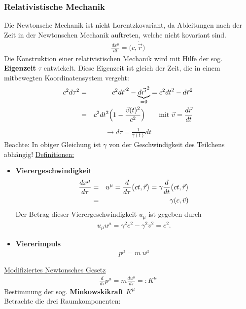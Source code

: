 \subsubsection{Relativistische Mechanik}
Die Newtonsche Mechanik ist nicht Lorentzkovariant, da Ableitungen nach der Zeit in der Newtonschen Mechanik auftreten, welche nicht kovariant sind.
\begin{eqnarray*} \frac{dx^ {\mu}}{dt} = \big ( c, \dot{\vec r} \big)\end{eqnarray*}
Die Konstruktion einer relativistischen Mechanik wird mit Hilfe der sog. {\bf Eigenzeit $\tau$} entwickelt. Diese Eigenzeit ist gleich der Zeit, die in einem mitbewegten Koordinatensystem vergeht:
\begin{eqnarray*}
c^2d\tau^2 &=& c^2{dt'}^2 -\underbrace{d\vec {r'}^2}_{= 0} = c^2{dt}^2 - d\vec r^2\\
&=& c^2dt^2\Big ( 1- \frac{\vec v(t)^2}{c^2} \Big) \qquad \text{mit }\vec v = \frac{d\vec r}{dt}
\end{eqnarray*}
\begin{eqnarray*}
\rightarrow \boxed{d\tau = \frac 1 {\gamma(t)} dt} \end{eqnarray*}
Beachte: In obiger Gleichung ist $\gamma$ von der Geschwindigkeit des Teilchens abhängig!
\underline{Definitionen:} 
\begin{itemize} \item{\bf Vierergeschwindigkeit}\\
\begin{eqnarray*}
\frac{dx^{\mu}}{d\tau} &=& u^{\mu} = \frac{d}{d\tau} \big( ct, \vec r\big ) = \gamma \frac d{dt} \big( ct, \vec r\big)\\ &=& \gamma(c,\vec v) \end{eqnarray*}
Der Betrag dieser Vierergeschwindigkeit $u_{\mu}$ ist gegeben durch
\begin{eqnarray*} u_{\mu}u^{\mu} = \gamma^2c^2 - \gamma^2v^2 = c^2.\end{eqnarray*}
\item{\bf Viererimpuls}\begin{eqnarray*} p^{\mu} = m \ u^{\mu}\end{eqnarray*}
\end{itemize}
\underline{Modifiziertes Newtonsches Gesetz}
\begin{eqnarray*}
\frac d{d\tau} p^{\mu} = m \frac{du^{\mu}}{d\tau} =: K^{\mu}
\end{eqnarray*}
Bestimmung der sog. {\bf Minkowskikraft} $K^{\mu}$\\
Betrachte die drei Raumkomponenten:

